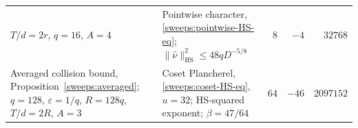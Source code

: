 \documentclass{article}
\begin{document}
\begin{longtable}{@{}p{.33\linewidth}p{.29\linewidth}r r r@{}}
$T/d=2r$, $q=16$, $A=4$
&
Pointwise character,\newline
\eqref{sweeps:pointwise-HS-eq};\newline
$\|\widehat\nu\|_{\mathrm{HS}}^2\le48qD^{-5/8}$
& $8$ & $-4$ & $32768$\\
\label{sweeps:assembly-collision-HS}
Averaged collision bound,\newline
Proposition~\ref{sweeps:averaged};\newline
$q=128$, $\varepsilon=1/q$, $R=128q$,\newline
$T/d=2R$, $A=3$
&
Coset Plancherel,\newline
\eqref{sweeps:coset-HS-eq}, $u=32$;\newline
HS-squared exponent;\newline
$\beta=47/64$
& $64$ & $-46$ & $2097152$\\
\end{longtable}
\endgroup
\end{document}

